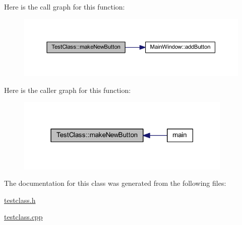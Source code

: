 Here is the call graph for this function\+:\nopagebreak
\begin{figure}[H]
\begin{center}
\leavevmode
\includegraphics[width=350pt]{class_test_class_ab263a6dea1c83b8206d4fc029f4294fd_cgraph}
\end{center}
\end{figure}
Here is the caller graph for this function\+:\nopagebreak
\begin{figure}[H]
\begin{center}
\leavevmode
\includegraphics[width=291pt]{class_test_class_ab263a6dea1c83b8206d4fc029f4294fd_icgraph}
\end{center}
\end{figure}


The documentation for this class was generated from the following files\+:\begin{DoxyCompactItemize}
\item 
\mbox{\hyperlink{testclass_8h}{testclass.\+h}}\item 
\mbox{\hyperlink{testclass_8cpp}{testclass.\+cpp}}\end{DoxyCompactItemize}

